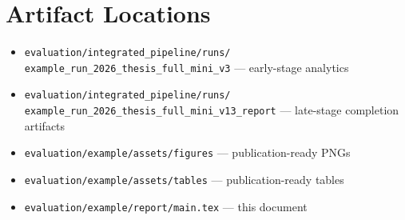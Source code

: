\documentclass[11pt,a4paper]{article}
\newcommand{\RunID}{example\_run\_2026\_thesis\_full\_mini\_v13\_report}
\begin{document}
\section{Artifact Locations}

\begin{itemize}
\item \texttt{evaluation/integrated\_pipeline/runs/}\\\texttt{example\_run\_2026\_thesis\_full\_mini\_v3} --- early-stage analytics
\item \texttt{evaluation/integrated\_pipeline/runs/}\\\texttt{\RunID} --- late-stage completion artifacts
\item \texttt{evaluation/example/assets/figures} --- publication-ready PNGs
\item \texttt{evaluation/example/assets/tables} --- publication-ready tables
\item \texttt{evaluation/example/report/main.tex} --- this document
\end{itemize}
\end{document}
